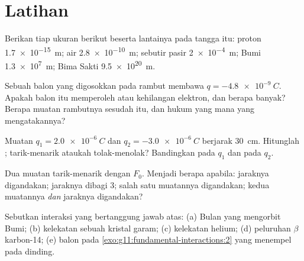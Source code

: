 \section{Latihan}

\begin{exercise}[$\star$]\label{exo:g11:fundamental-interactions:1}
Berikan  tiap ukuran berikut beserta lantainya pada tangga
itu: proton \qty{1.7e-15}{m};  air \qty{2.8e-10}{m}; sebutir
pasir \qty{2e-4}{m}; Bumi \qty{1.3e7}{m}; Bima Sakti \qty{9.5e20}{m}.
\end{exercise}

\begin{exercise}[$\star$]\label{exo:g11:fundamental-interactions:2}
Sebuah balon yang digosokkan pada rambut membawa
$q = \qty{-4.8e-9}{C}$. Apakah balon itu memperoleh atau kehilangan
elektron, dan berapa banyak? Berapa muatan rambutnya sesudah itu, dan
hukum yang mana yang mengatakannya?
\end{exercise}

\begin{exercise}[$\star$]\label{exo:g11:fundamental-interactions:3}
Muatan $q_1 = \qty{+2.0e-6}{C}$ dan $q_2 = \qty{-3.0e-6}{C}$ berjarak
\qty{30}{cm}. Hitunglah ; tarik-menarik ataukah tolak-menolak?
Bandingkan  pada $q_1$ dan  pada $q_2$.
\end{exercise}

\begin{exercise}[$\star$]\label{exo:g11:fundamental-interactions:4}
Dua muatan tarik-menarik dengan  $F_0$. Menjadi berapa 
apabila: jaraknya digandakan; jaraknya dibagi $3$; salah satu muatannya
digandakan; kedua muatannya \emph{dan} jaraknya digandakan?
\end{exercise}

\begin{exercise}[$\star$]\label{exo:g11:fundamental-interactions:5}
Sebutkan interaksi yang bertanggung jawab atas: (a) Bulan yang
mengorbit Bumi; (b) kelekatan sebuah kristal garam; (c) kelekatan  helium; (d) peluruhan $\beta$ karbon-14; (e) balon pada
\cref{exo:g11:fundamental-interactions:2} yang menempel pada dinding.
\end{exercise}

